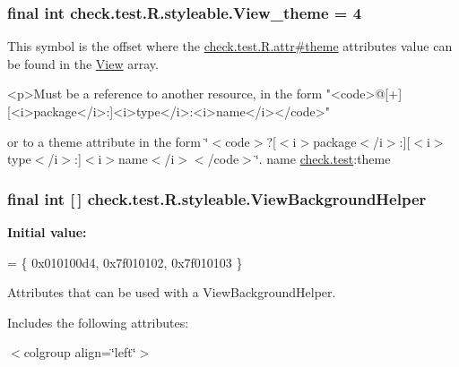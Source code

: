 \subsubsection[{View\+\_\+theme}]{\setlength{\rightskip}{0pt plus 5cm}final int check.\+test.\+R.\+styleable.\+View\+\_\+theme = 4\hspace{0.3cm}{\ttfamily [static]}}\label{classcheck_1_1test_1_1_r_1_1styleable_a2c622119b55ec8f1cab226d62d3022bf}
This symbol is the offset where the \hyperlink{classcheck_1_1test_1_1_r_1_1attr_ae33e84d61630420c9ba3073185b3245d}{check.\+test.\+R.\+attr\#theme} attribute\textquotesingle{}s value can be found in the \hyperlink{classcheck_1_1test_1_1_r_1_1styleable_a649d1cf46b1780fca1185680fabbb1e1}{View} array.

\begin{DoxyVerb}      <p>Must be a reference to another resource, in the form "<code>@[+][<i>package</i>:]<i>type</i>:<i>name</i></code>"
\end{DoxyVerb}
 or to a theme attribute in the form \char`\"{}$<$code$>$?\mbox{[}$<$i$>$package$<$/i$>$\+:\mbox{]}\mbox{[}$<$i$>$type$<$/i$>$\+:\mbox{]}$<$i$>$name$<$/i$>$$<$/code$>$\char`\"{}.  name \hyperlink{namespacecheck_1_1test}{check.\+test}\+:theme \hypertarget{classcheck_1_1test_1_1_r_1_1styleable_ae6adc75d344e9e404acc591e2de26ff7}{}
\subsubsection[{View\+Background\+Helper}]{\setlength{\rightskip}{0pt plus 5cm}final int \mbox{[}$\,$\mbox{]} check.\+test.\+R.\+styleable.\+View\+Background\+Helper\hspace{0.3cm}{\ttfamily [static]}}\label{classcheck_1_1test_1_1_r_1_1styleable_ae6adc75d344e9e404acc591e2de26ff7}
{\bfseries Initial value\+:}
\begin{DoxyCode}
= \{
            0x010100d4, 0x7f010102, 0x7f010103
        \}
\end{DoxyCode}
Attributes that can be used with a View\+Background\+Helper. 

Includes the following attributes\+:

\begin{TabularC}{0}
\hline
\end{TabularC}
$<$colgroup align=\char`\"{}left\char`\"{}$>$ 

